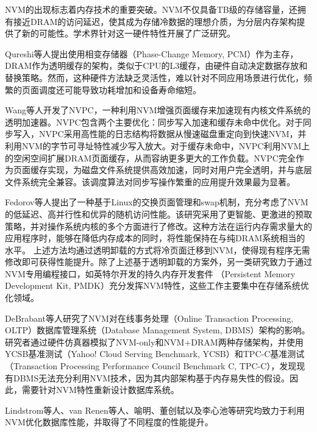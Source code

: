 NVM的出现标志着内存技术的重要突破。NVM不仅具备TB级的存储容量，还拥有接近DRAM的访问延迟，使其成为存储冷数据的理想介质，为分层内存架构提供了新的可能性。学术界针对这一硬件特性开展了广泛研究。

Qureshi等人提出使用相变存储器（Phase-Change Memory, PCM）作为主存，DRAM作为透明缓存的架构，类似于CPU的L3缓存，由硬件自动决定数据存放和替换策略。然而，这种硬件方法缺乏灵活性，难以针对不同应用场景进行优化，频繁的页面调度还可能导致功耗增加和设备寿命缩短。

Wang等人开发了NVPC，一种利用NVM增强页面缓存来加速现有内核文件系统的透明加速器。NVPC包含两个主要优化：同步写入加速和缓存未命中优化。对于同步写入，NVPC采用高性能的日志结构将数据从慢速磁盘重定向到快速NVM，并利用NVM的字节可寻址特性减少写入放大。对于缓存未命中，NVPC利用NVM上的空闲空间扩展DRAM页面缓存，从而容纳更多更大的工作负载。NVPC完全作为页面缓存实现，为磁盘文件系统提供高效加速，同时对用户完全透明，并与底层文件系统完全兼容。该调度算法对同步写操作繁重的应用提升效果最为显著。

Fedorov等人提出了一种基于Linux的交换页面管理和swap机制，充分考虑了NVM的低延迟、高并行性和优异的随机访问性能。该研究采用了更智能、更激进的预取策略，并对操作系统内核的多个方面进行了修改。这种方法在运行内存需求量大的应用程序时，能够在降低内存成本的同时，将性能保持在与纯DRAM系统相当的水平。
上述方法均通过透明卸载的方式将冷页面迁移到NVM，使得现有程序无需修改即可获得性能提升。除了上述基于透明卸载的方案外，另一类研究致力于通过NVM专用编程接口，如英特尔开发的持久内存开发套件 （Persistent Memory Development Kit, PMDK）充分发挥NVM特性，这些工作主要集中在存储系统优化领域。

DeBrabant等人研究了NVM对在线事务处理（Online Transaction Processing, OLTP）数据库管理系统（Database Management System, DBMS）架构的影响。研究者通过硬件仿真器模拟了NVM-only和NVM+DRAM两种存储架构，并使用YCSB基准测试（Yahoo! Cloud Serving Benchmark, YCSB）和TPC-C基准测试（Transaction Processing Performance Council Benchmark C, TPC-C），发现现有DBMS无法充分利用NVM技术，因为其内部架构基于内存易失性的假设。因此，需要针对NVM特性重新设计数据库系统。

Lindstrom等人、van Renen等人、喻明、董创轼以及李心池等研究均致力于利用NVM优化数据库性能，并取得了不同程度的性能提升。


